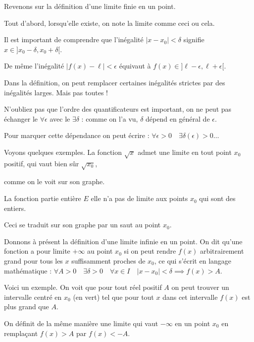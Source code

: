 \diapo

Revenons sur la définition d'une limite finie en un point.

\change
Tout d'abord, lorsqu'elle existe, on note la limite comme ceci ou cela.

\change
Il est important de comprendre que l'inégalité $\vert x-x_0\vert <\delta$ signifie
$x \in ]x_0 - \delta, x_0+\delta[$.

\change
De même l'inégalité $\vert f(x)-\ell\vert <\epsilon$ équivaut à $f(x) \in ]\ell - \epsilon, \ell+\epsilon[$.

\change
Dans la définition, on peut remplacer certaines inégalités strictes par des inégalités larges. Mais pas toutes !

\change
N'oubliez pas que l'ordre des quantificateurs est important, on ne peut pas échanger le $\forall \epsilon$ avec le $\exists \delta$ : comme on l'a vu, $\delta$ dépend en général de $\epsilon$. 

\change
Pour marquer cette dépendance on peut écrire :
$\forall \epsilon>0 \quad \exists \delta(\epsilon) >0 \ldots$

\diapo


Voyons quelques exemples. La fonction $\sqrt x$ admet une limite en tout point $x_0$ positif, qui vaut bien sûr $\sqrt{x_0}$,

\change
comme on le voit sur son graphe.

\change
La fonction partie entière $E$ elle n'a pas de limite aux points $x_0$ qui sont des entiers.

\change
Ceci se traduit sur son graphe par un saut au point $x_0$.

\diapo

Donnons à présent la définition d'une limite infinie en un point. On dit qu'une fonction a pour limite $+\infty$ au point $x_0$ si on peut rendre $f(x)$ arbitrairement grand pour tous les $x$ suffisamment proches de $x_0$, ce qui s'écrit en langage mathématique : $\forall A>0 \quad \exists \delta>0 \quad \forall x\in I \quad \vert x-x_0\vert <\delta \implies f(x)>A.$

\change
Voici un exemple. On voit que pour tout réel positif $A$ on peut trouver un intervalle centré en $x_0$ (en vert) tel que pour tout $x$ dans cet intervalle $f(x)$ est plus grand que $A$.

\change
On définit de la même manière une limite qui vaut $-\infty$ en un point $x_0$ en remplaçant $ f(x)>A$ par $ f(x)<-A$.


